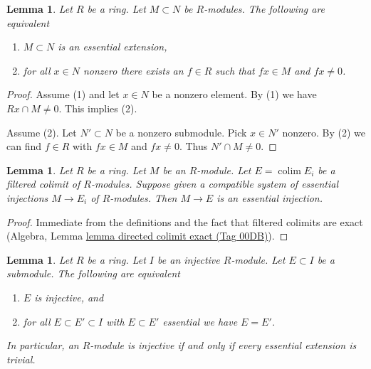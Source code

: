 \documentclass{amsart}
\theoremstyle{plain}
\newtheorem{lemma}[subsection]{Lemma}
\theoremstyle{definition}
\theoremstyle{remark}
\numberwithin{equation}{subsection}
\def\colim{\mathop{\mathrm{colim}}\nolimits}
\begin{document}
\begin{lemma}
\label{lemma-essential-extension}
Let $R$ be a ring. Let $M \subset N$ be $R$-modules. The following
are equivalent
\begin{enumerate}
\item $M \subset N$ is an essential extension,
\item for all $x \in N$ nonzero there exists an $f \in R$ such that $fx \in M$
and $fx \not = 0$.
\end{enumerate}
\end{lemma}

\begin{proof}
Assume (1) and let $x \in N$ be a nonzero element. By (1) we have
$Rx \cap M \not = 0$. This implies (2).

\medskip\noindent
Assume (2). Let $N' \subset N$ be a nonzero submodule. Pick $x \in N'$
nonzero. By (2) we can find $f \in R$ with $fx \in M$ and $fx \not = 0$.
Thus $N' \cap M \not = 0$.
\end{proof}


\begin{lemma}
\label{lemma-union-essential-extensions}
Let $R$ be a ring. Let $M$ be an $R$-module. Let $E = \colim E_i$
be a filtered colimit of $R$-modules. Suppose given a compatible
system of essential injections $M \to E_i$ of $R$-modules.
Then $M \to E$ is an essential injection.
\end{lemma}

\begin{proof}
Immediate from the definitions and the fact that filtered
colimits are exact (Algebra, Lemma \href{https://stacks.math.columbia.edu/tag/00DB}{lemma directed colimit exact (Tag 00DB)}).
\end{proof}


\begin{lemma}
\label{lemma-essential-extensions-in-injective}
Let $R$ be a ring. Let $I$ be an injective $R$-module. Let $E \subset I$
be a submodule. The following are equivalent
\begin{enumerate}
\item $E$ is injective, and
\item for all $E \subset E' \subset I$ with $E \subset E'$ essential
we have $E = E'$.
\end{enumerate}
In particular, an $R$-module is injective if and only if every essential
extension is trivial.
\end{lemma}
\end{document}

